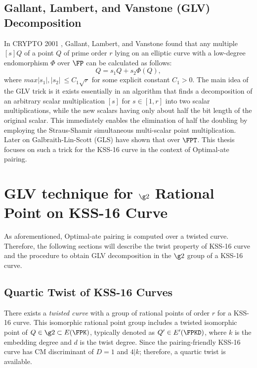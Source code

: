 \subsection{Gallant, Lambert, and Vanstone (GLV) Decomposition}
In CRYPTO 2001 \cite{C:GalLamVan01}, Gallant, Lambert, and Vanstone found that any multiple $[s]Q$ of a point $Q$ of prime order $r$ lying on an elliptic curve with a low-degree endomorphism $\Phi$ over $\FP$ can be calculated as follows:
\begin{equation}
    [s]Q = s_1 Q + s_2 \Phi(Q),  
\end{equation}
where $max{|s_1|,|s_2|}  ~\leq C_1 \sqrt{r}$ for some explicit constant $C_1 > 0$.
The main idea of the GLV trick is it exists essentially in an algorithm that finds a decomposition of an arbitrary scalar multiplication $[s]$ for $s \in  [1,r]$ into two scalar multiplications, while the new scalars having only about half the bit length of the original scalar.
This immediately enables the elimination of half the doubling by employing the Straus-Shamir simultaneous multi-scalar point multiplication. 
Later on Galbraith-Lin-Scott (GLS) have shown that over $\FPT$. 
This thesis focuses on such a trick for the KSS-16 curve in the context of Optimal-ate pairing. 

\section{GLV technique for $\g2$ Rational Point on  KSS-16 Curve} \label{Proposal}
As aforementioned, Optimal-ate pairing is computed over a twisted curve. 
Therefore, the following sections will describe the twist property of KSS-16 curve and the procedure to obtain GLV decomposition in the $\g2$ group of a KSS-16 curve.

\subsection{Quartic Twist of KSS-16 Curves} \label{Quartic_twist}
There exists a \textit{twisted curve} with a group of rational points of order $r$ for a KSS-16 curve. 
This isomorphic rational point group includes a twisted isomorphic point of $Q \in \g2 \subset E(\FPK)$, typically denoted as $Q' \in E'(\FPKD)$, where $k$ is the embedding degree and $d$ is the twist degree.  
Since the pairing-friendly KSS-16 \cite{EPRINT:KacSchSco07} curve has CM discriminant of $D = 1$ and $4|k$; therefore, a quartic twist is available.

